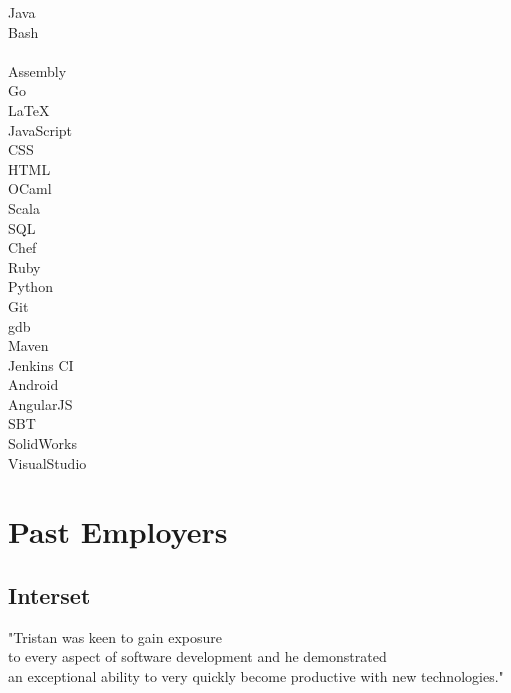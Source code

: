 \documentclass[letterpaper]{deedy-resume-modified} %
\begin{document}
\begin{minipage}[t]{0.33\textwidth}
Java \tab {\bf + + + + +}\\
Bash \tab {\bf + + + + +}\\
\CPP \tab {\bf + + + +}\\
Assembly \tab {\bf + + +}\\
Go \tab {\bf + + +}\\
\LaTeX \tab {\bf + + +}\\
JavaScript \tab {\bf + + +}\\
CSS \tab {\bf + + +}\\
HTML \tab {\bf + + +}\\
OCaml \tab {\bf + + +}\\
Scala \tab {\bf + + +}\\
SQL \tab {\bf + + +}\\
Chef \tab {\bf + +}\\
Ruby \tab {\bf + +}\\
Python \tab {\bf + +}\\

\sectionspace
{}
Git \tab {\bf + + + + +}\\
gdb \tab {\bf + + + +}\\
Maven \tab {\bf + + + +}\\
Jenkins CI \tab {\bf + + + +}\\
Android \tab {\bf + + +}\\
AngularJS \tab {\bf + + +}\\
SBT \tab {\bf + + +}\\
SolidWorks \tab {\bf + +}\\
VisualStudio \tab {\bf + +}\\

\sectionspace


\section{Past Employers}
\subsection{Interset}
"Tristan was keen to gain exposure\\to every aspect of software development and he demonstrated\\an exceptional ability to very quickly become productive with new technologies." \\

\end{minipage} %
\end{document}

